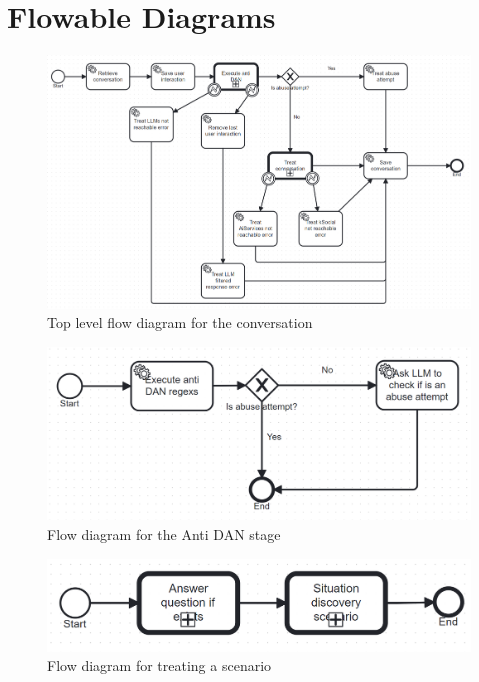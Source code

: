 \documentclass[a4paper,12pt,twoside]{ThesisStyle}
\begin{document}
\chapter{Flowable Diagrams}
\label{cap:flowable_diagrams}

\begin{figure}[H]
  \centering
  \includegraphics[width=1\textwidth]{img/Conversation_process.bpmn20.png}
  \caption{Top level flow diagram for the conversation}
  \label{fig:conversation}
\end{figure}

\begin{figure}[H]
  \centering
  \includegraphics[width=1\textwidth]{img/Execute_anti_DAN.bpmn20.png}
  \caption{Flow diagram for the Anti DAN stage}
  \label{fig:antidan}
\end{figure}

\begin{figure}[H]
  \centering
  \includegraphics[width=1\textwidth]{img/Treat_conversation_scenario.bpmn20.png}
  \caption{Flow diagram for treating a scenario}
  \label{fig:treatscenario}
\end{figure}
\end{document}
